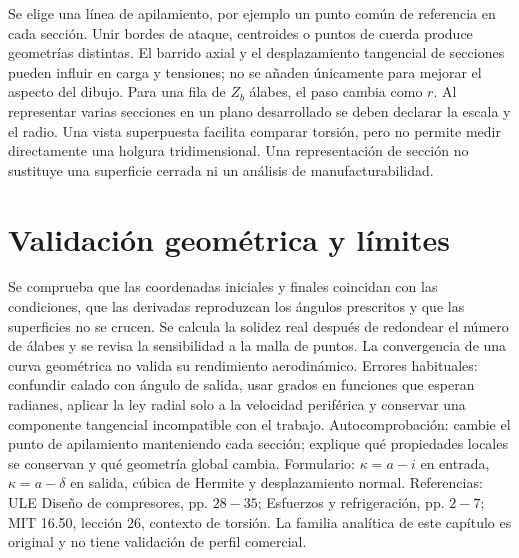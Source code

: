 \documentclass[10pt,openany]{book}
\begin{document}
Se elige una línea de apilamiento, por ejemplo un punto común de referencia en cada sección. Unir bordes de ataque, centroides o puntos de cuerda produce geometrías distintas. El barrido axial y el desplazamiento tangencial de secciones pueden influir en carga y tensiones; no se añaden únicamente para mejorar el aspecto del dibujo.
Para una fila de \(Z_b\) álabes, el paso cambia como \(r\). Al representar varias secciones en un plano desarrollado se deben declarar la escala y el radio. Una vista superpuesta facilita comparar torsión, pero no permite medir directamente una holgura tridimensional. Una representación de sección no sustituye una superficie cerrada ni un análisis de manufacturabilidad.

\section{Validación geométrica y límites}

Se comprueba que las coordenadas iniciales y finales coincidan con las condiciones, que las derivadas reproduzcan los ángulos prescritos y que las superficies no se crucen. Se calcula la solidez real después de redondear el número de álabes y se revisa la sensibilidad a la malla de puntos. La convergencia de una curva geométrica no valida su rendimiento aerodinámico.
Errores habituales: confundir calado con ángulo de salida, usar grados en funciones que esperan radianes, aplicar la ley radial solo a la velocidad periférica y conservar una componente tangencial incompatible con el trabajo. Autocomprobación: cambie el punto de apilamiento manteniendo cada sección; explique qué propiedades locales se conservan y qué geometría global cambia.
Formulario: \(\kappa=a-i\) en entrada, \(\kappa=a-\delta\) en salida, cúbica de Hermite y desplazamiento normal. Referencias: ULE Diseño de compresores, pp. \(28-35\); Esfuerzos y refrigeración, pp. \(2-7\); MIT 16.50, lección 26, contexto de torsión. La familia analítica de este capítulo es original y no tiene validación de perfil comercial.
\end{document}
